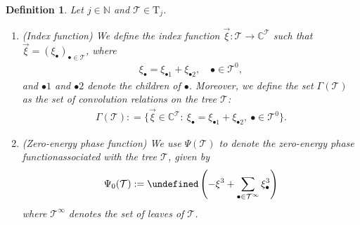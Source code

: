 \documentclass[a4paper,
11pt,  reqno]{amsart}
\newcommand{\5}{\textup{V}}
\newtheorem{definition}[theorem]{Definition}
\theoremstyle{remark}
\newcommand{\CC}{\mathbb{C}}
\newcommand{\bul}{\bullet}
\let\Re=\undefined\DeclareMathOperator*{\Re}{Re}
\newcommand{\TT}{\mathcal{T}}
\newcommand{\Tr}{\mathrm{T}}
\newcommand{\G}{\Gamma}
\newcommand{\N}{\mathbb{N}}
\numberwithin{equation}{section}
\numberwithin{theorem}{section}
\begin{document}
\begin{definition}\rm 

Let $j\in\N$ and $\TT \in \Tr_j$. 

\begin{enumerate}
\item[(i)] (Index function) 
We define the index function $\vec\xi : \TT\to \CC^\TT$ such that $\vec\xi = (\xi_\bul)_{\bul\in\TT}$, where
\begin{align}
\label{parent}
\xi_\bul = \xi_{\bul1} + \xi_{\bul2}, \quad \bul\in \TT^0,
\end{align}
and $\bul1$ and $\bul2$ denote the children of $\bul$. Moreover, we define the set $\G(\TT)$ as the set of convolution relations on the tree $\TT$:
\begin{align}
\label{Gamma}
\G(\TT) : = \big\{ \vec\xi \in \CC^\TT: \ \xi_\bul = \xi_{\bul1} + \xi_{\bul2}, \ \bul \in \TT^0 \big\}. 
\end{align}


\smallskip

\item[(ii)] (Zero-energy phase function) 
We use $\Psi(\TT)$ to denote the \textit{zero-energy phase function}associated with the tree $\TT$, given by
\begin{align}
\label{psi0-tree}
\Psi_0(\TT)
:=
\Re\left(- \xi^3 + \sum_{\bul\in \TT^\infty} \xi_\bul^3\right)
\end{align}
where $\TT^\infty$ denotes the set of leaves of $\TT$. 



\end{enumerate}
\end{definition}
\end{document}
